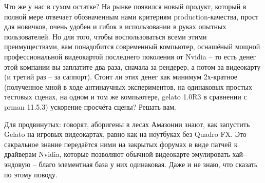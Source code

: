  Что же у нас в сухом остатке? На рынке появился
    новый продукт, который в полной мере отвечает обозначенным нами
    критериям production-качества, прост для новичков, очень удобен и
    гибок в использовании в руках опытных пользователей. Но для того,
    чтобы воспользоваться всеми этими преимуществами, вам понадобится
    современный компьютер, оснашёный мощной профессиональной
    видеокартой последнего поколения от Nvidia – то есть денег этой
    компании вы заплатите два раза, сначала за рендерер, а потом за
    видеокарту (и третий раз – за саппорт). Стоит ли этих денег как
    минимум 2х-кратное (полученное мной в ходе антинаучных
    экспериментов, на одинаковых простых тестовых сценах, на одном и
    том же компьютере, gelato 1.0R3 в сравнении с prman 11.5.3)
    ускорение просчёта сцены? Решать вам.
  

 Для
    продвинутых: говорят, аборигены в
    лесах Амазонии знают, как запустить Gelato на игровых видеокартах,
    равно как на ноутбуках  без Quadro FX. Это сакральное знание передаётся ними на закрытых
    форумах в виде патчей к драйверам Nvidia, которые позволяют обычной
    видеокарте эмулировать хай-эндовую – благо элементная база у них
    одинаковая. Даже и не знаю, что сказать по этому
    поводу.